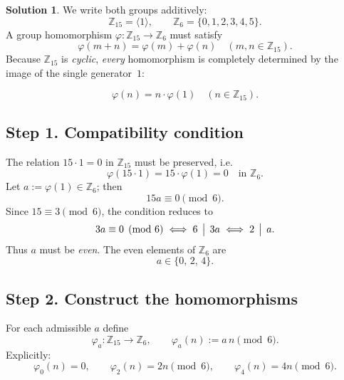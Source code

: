 \documentclass[12pt]{article}
\theoremstyle{definition} %
\newtheorem{solution}{Solution}
\theoremstyle{plain} %
\begin{document}
        \begin{solution}
          We write both groups additively:
          \[
             \mathbb{Z}_{15}=\bigl\langle 1\bigr\rangle,
             \qquad
             \mathbb{Z}_{6}=\{0,1,2,3,4,5\}.
          \]
          A group homomorphism $\varphi:\mathbb{Z}_{15}\to\mathbb{Z}_{6}$ must satisfy
          \[
             \varphi(m+n)=\varphi(m)+\varphi(n)\quad
             (m,n\in\mathbb{Z}_{15}).
          \]
          Because $\mathbb{Z}_{15}$ is \emph{cyclic}, \emph{every} homomorphism is completely
          determined by the image of the single generator~$1$:
          
          \[
                \boxed{\;
                \varphi(n)=n\cdot\varphi(1)\quad(n\in\mathbb{Z}_{15}).
                \;}
          \]
          
          \subsection*{Step 1.  Compatibility condition}
          
          The relation $15\cdot 1=0$ in $\mathbb{Z}_{15}$ must be preserved, i.e. 
          \[
                \varphi(15\cdot 1)=15\cdot\varphi(1)=0\quad\text{in }\mathbb{Z}_{6}.
          \]
          Let $a:=\varphi(1)\in\mathbb{Z}_{6}$; then
          \[
                15a\equiv 0 \pmod{6}.
          \]
          Since $15\equiv 3\pmod 6$, the condition reduces to
          \[
                3a\equiv 0\pmod 6
                \;\Longleftrightarrow\;
                6\,\bigm|\,3a
                \;\Longleftrightarrow\;
                2\,\bigm|\,a.
          \]
          Thus $a$ must be \emph{even}.  The even elements of $\mathbb{Z}_{6}$ are
          \[
                a\in\{0,\,2,\,4\}.
          \]
          
          \subsection*{Step 2.  Construct the homomorphisms}
          
          For each admissible $a$ define
          \[
               \varphi_{a} : \mathbb{Z}_{15}\longrightarrow \mathbb{Z}_{6},
               \qquad
               \varphi_{a}(n):=a\,n\pmod 6.
          \]
          Explicitly:
          \[
             \varphi_{0}(n)=0,   \qquad
             \varphi_{2}(n)=2n\pmod 6, \qquad
             \varphi_{4}(n)=4n\pmod 6.
          \]
          

\end{solution}
\end{document}
